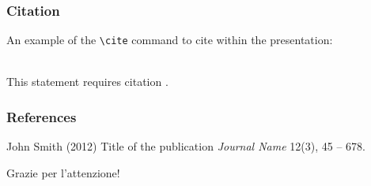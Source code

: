 \documentclass{beamer}
\begin{document}
\begin{frame}[fragile] %
\frametitle{Citation}
An example of the \verb|\cite| command to cite within the presentation:\\~

This statement requires citation \cite{p1}.
\end{frame}


\begin{frame}
\frametitle{References}
\footnotesize{
\begin{thebibliography}{99} %
 John Smith (2012)
\newblock Title of the publication
\newblock \emph{Journal Name} 12(3), 45 -- 678.
\end{thebibliography}
}
\end{frame}


\begin{frame}
\Huge{\centerline{Grazie per l'attenzione!}}
\end{frame}

\end{document}
